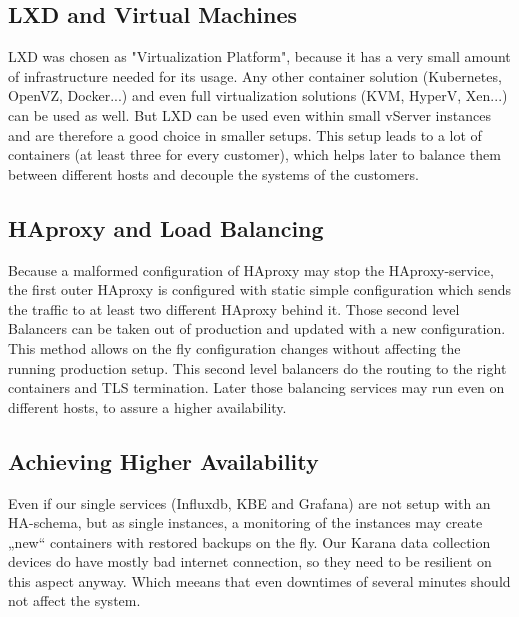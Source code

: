 \subsection{LXD and Virtual Machines}

LXD was chosen as "Virtualization Platform", because it has a very small amount of infrastructure needed for its usage. Any other container solution (Kubernetes, OpenVZ, Docker...) and even full virtualization solutions (KVM, HyperV, Xen...) can be used as well.
But LXD can be used even within small vServer instances and are therefore a good choice in smaller setups. This setup leads to a lot of containers (at least three for every customer), which helps later to balance them between different hosts and decouple the systems of the customers.


\subsection{HAproxy and Load Balancing}

Because a malformed configuration of HAproxy may stop the HAproxy-service, the first outer HAproxy is configured with static simple configuration which sends the traffic to at least two different HAproxy behind it. Those second level Balancers can be taken out of production and updated with a new configuration. This method allows on the fly configuration changes without affecting the running production setup.
This second level balancers do the routing to the right containers and TLS termination.
Later those balancing services may run even on different hosts, to assure a higher availability.

\subsection{Achieving Higher Availability}
Even if our single services (Influxdb, KBE and Grafana) are not setup with an HA-schema, but as single instances, a monitoring of the instances may create „new“ containers with restored backups on the fly. Our Karana data collection devices do have mostly bad internet connection, so they need to be resilient on this aspect anyway. Which meeans that even downtimes of several minutes should not affect the system.